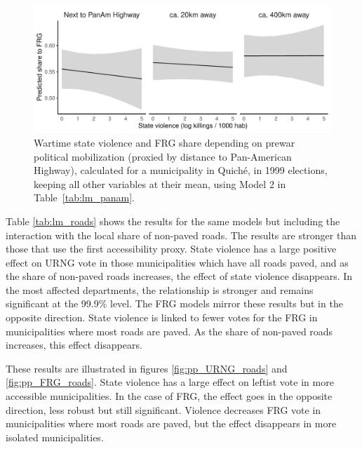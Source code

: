 \documentclass[12pt, notitlepage]{article}
\begin{document}
\begin{figure}[htb!]
  \centering
    \includegraphics[width = .75\textwidth]{img/pp_FRG_panam}

  \caption{Wartime state violence and FRG share depending on prewar political mobilization (proxied by distance to Pan-American Highway), calculated for a municipality in Quiché, in 1999 elections, keeping all other variables at their mean, using Model 2 in Table~\ref{tab:lm_panam}.} \label{fig:pp_FRG_panam}


\end{figure}

Table \ref{tab:lm_roads} shows the results for the same models but including the interaction with the local share of non-paved roads.
The results are stronger than those that use the first accessibility proxy.
State violence has a large positive effect on URNG vote in those municipalities which have all roads paved, and as the share of non-paved roads increases, the effect of state violence disappears.
In the most affected departments, the relationship is stronger and remains significant at the 99.9\% level.
The FRG models mirror these results but in the opposite direction.
State violence is linked to fewer votes for the FRG in municipalities where most roads are paved. As the share of non-paved roads increases, this effect disappears.



These results are illustrated in figures \ref{fig:pp_URNG_roads} and \ref{fig:pp_FRG_roads}.
State violence has a large effect on leftist vote in more accessible municipalities.
In the case of FRG, the effect goes in the opposite direction, less robust but still significant.
Violence decreases FRG vote in municipalities where most roads are paved, but the effect disappears in more isolated municipalities.
\end{document}
